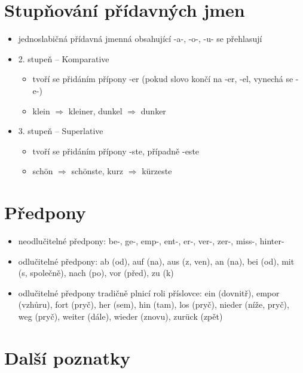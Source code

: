 \documentclass[a4paper,12pt]{report}
\begin{document}
\section{Stupňování přídavných jmen}
\begin{itemize}
  \item  jednoslabičná přídavná jmenná obsahující  -a-, -o-, -u- se přehlasují
  \item 2. stupeň -- Komparative
    \begin{itemize}
      \item tvoří se přidáním přípony -er (pokud slovo končí na -er, -el, vynechá se -e-)
      \item klein $\Rightarrow$ kleiner, dunkel $\Rightarrow$ dunker
    \end{itemize}
  \item 3. stupeň -- Superlative
    \begin{itemize}
      \item tvoří se přidáním přípony -ste, případně -este
      \item schön $\Rightarrow$ schönste, kurz $\Rightarrow$ kürzeste
    \end{itemize}
\end{itemize}

	\section{Předpony}
    \begin{itemize}
      \item neodlučitelné předpony: be-, ge-, emp-, ent-, er-, ver-, zer-, miss-, hinter-
      \item odlučitelné předpony: ab (od), auf (na), aus (z, ven), an (na), bei (od), mit (s, společně), nach (po), vor (před), zu (k)
      \item odlučitelné předpony tradičně plnicí roli příslovce: ein (dovnitř), empor (vzhůru), fort (pryč), her (sem), hin (tam), los (pryč), nieder (níže, pryč), weg (pryč), weiter (dále), wieder (znovu), zurück (zpět)
    \end{itemize}

\section{Další poznatky}
\end{document}
